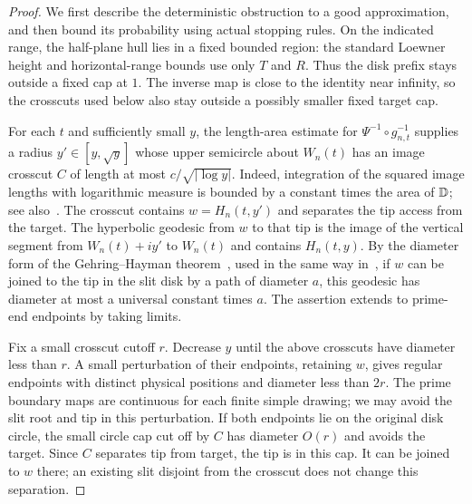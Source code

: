 \begin{proof}
We first describe the deterministic obstruction to a good
approximation, and then bound its probability using actual stopping
rules.  On the indicated range, the half-plane hull lies in a fixed
bounded region: the standard Loewner height and horizontal-range
bounds use only $T$ and $R$.  Thus the disk prefix stays outside a
fixed cap at $1$.  The inverse map is close to the identity near
infinity, so the crosscuts used below also stay outside a possibly
smaller fixed target cap.

For each $t$ and sufficiently small $y$, the length-area estimate
for $\Psi^{-1}\circ g_{n,t}^{-1}$ supplies a radius
$y'\in[y,\sqrt y]$ whose upper semicircle about $W_n(t)$ has an
image crosscut $C$ of length at most
$c/\sqrt{|\log y|}$.  Indeed, integration of the squared image
lengths with logarithmic measure is bounded by a constant times
the area of $\mathbb D$; see also~\cite[Proposition~2.2]{Pommerenke}.
The crosscut contains $w=H_n(t,y')$ and
separates the tip access from the target.  The hyperbolic geodesic
from $w$ to that tip is the image of the vertical segment from
$W_n(t)+iy'$ to $W_n(t)$ and contains $H_n(t,y)$.  By the diameter
form of the Gehring--Hayman theorem~\cite[Theorem~4.20]{Pommerenke},
used in the same way in~\cite[Proof of Theorem 3.11]{KS}, if $w$ can be joined to the
tip in the slit disk by a path of diameter $a$, this geodesic has
diameter at most a universal constant times $a$.  The assertion
extends to prime-end endpoints by taking limits.

Fix a small crosscut cutoff $r$.  Decrease $y$ until the above
crosscuts have diameter less than $r$.  A small perturbation of
their endpoints, retaining $w$, gives regular endpoints with
distinct physical positions and diameter less than $2r$.  The
prime boundary maps are continuous for each finite simple drawing;
we may avoid the slit root and tip in this perturbation.
If both endpoints lie on the original disk circle, the small
circle cap cut off by $C$ has diameter $O(r)$ and avoids the
target.  Since $C$ separates tip from target, the tip is in this
cap.  It can be joined to $w$ there; an existing slit disjoint
from the crosscut does not change this separation.


\end{proof}
